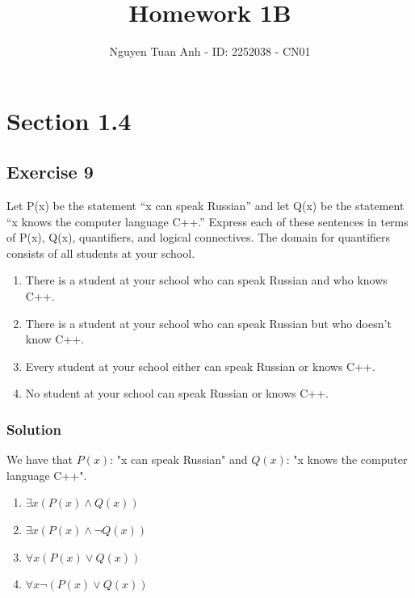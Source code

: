 \documentclass{article}
\title{Homework 1B}
\author{Nguyen Tuan Anh - ID: 2252038 - CN01}
\begin{document}
\maketitle
\section*{Section 1.4}
\subsection*{Exercise 9}
Let P(x) be the statement “x can speak Russian” and let Q(x) be the statement “x knows the computer language C++.” Express each of these sentences in terms of P(x), Q(x), quantifiers, and logical connectives. The domain for quantifiers consists of all students at your school.
\begin{enumerate} [label = (\alph*)]
    \item There is a student at your school who can speak Russian and who knows C++.
    \item There is a student at your school who can speak Russian but who doesn’t know C++.
    \item Every student at your school either can speak Russian or knows C++.
    \item No student at your school can speak Russian or knows C++.
\end{enumerate}

\subsubsection*{Solution}
We have that $P(x)$: "x can speak Russian" and $Q(x)$: "x knows the computer language C++".
\begin{enumerate} [label = (\alph*)]
    \item $\exists x(P(x) \land Q(x))$
    \item $\exists x(P(x) \land \lnot Q(x))$
    \item $\forall x (P(x) \lor Q(x))$
    \item $\forall x \lnot(P(x) \lor Q(x))$
\end{enumerate}
\end{document}
